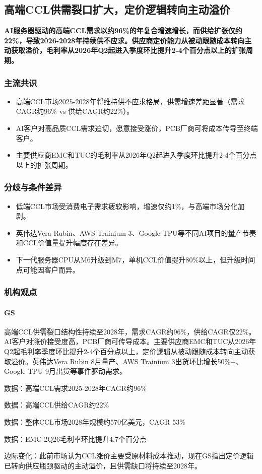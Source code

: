 \documentclass[11pt]{ctexart}
\begin{document}
\subsection{高端CCL供需裂口扩大，定价逻辑转向主动溢价}
\textbf{AI服务器驱动的高端CCL需求以约96\%的年复合增速增长，而供给扩张仅约22\%，导致2026-2028年持续供不应求。供应商定价能力从被动跟随成本转向主动获取溢价，毛利率从2026年Q2起进入季度环比提升2-4个百分点以上的扩张周期。}
\subsubsection*{主流共识}
\begin{itemize}
  \item 高端CCL市场2025-2028年将维持供不应求格局，供需增速差距显著（需求CAGR约96\% vs 供给CAGR约22\%）。
  \item AI客户对高品质CCL需求迫切，愿意接受涨价，PCB厂商可将成本传导至终端客户。
  \item 主要供应商EMC和TUC的毛利率从2026年Q2起进入季度环比提升2-4个百分点以上的扩张周期。
\end{itemize}
\subsubsection*{分歧与条件差异}
\begin{itemize}
  \item 低端CCL市场受消费电子需求疲软影响，增速仅约1\%，与高端市场分化加剧。
  \item 英伟达Vera Rubin、AWS Trainium 3、Google TPU等不同AI项目的量产节奏和CCL价值量提升幅度存在差异。
  \item 下一代服务器CPU从M6升级到M7，单机CCL价值提升80\%以上，但升级时间点可能因客户而异。
\end{itemize}
\subsubsection*{机构观点}
\paragraph{GS} 高端CCL供需裂口结构性持续至2028年，需求CAGR约96\%，供给CAGR仅22\%。AI客户对涨价接受度高，PCB厂商可传导成本。主要供应商EMC和TUC从2026年Q2起毛利率季度环比提升2-4个百分点以上，定价逻辑从被动跟随成本转向主动获取溢价。英伟达Vera Rubin 8月量产、AWS Trainium 3出货环比增长50\%+、Google TPU 9月出货等事件驱动需求。
{\small\color{refgray}数据：高端CCL需求2025-2028年CAGR约96\%\par}
{\small\color{refgray}数据：高端CCL供给CAGR约22\%\par}
{\small\color{refgray}数据：整体CCL市场2028年规模约570亿美元，CAGR 53\%\par}
{\small\color{refgray}数据：EMC 2Q26毛利率环比提升4.7个百分点\par}
{\small\color{refgray}边际变化：此前市场认为CCL涨价主要受原材料成本推动，现在GS指出定价逻辑已转向供应瓶颈驱动的主动溢价，且供需缺口将持续至2028年。\par}
\end{document}
